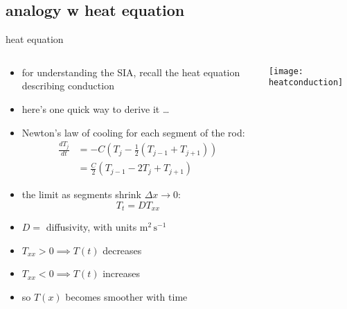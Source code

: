 \subsection{analogy w heat equation}

\begin{frame}{heat equation}

\small
\begin{columns}
\begin{column}{0.6\textwidth}
\begin{itemize}
\item for understanding the SIA, recall the heat equation describing conduction
\item here's one quick way to derive it \dots
\item Newton's law of cooling for each segment of the rod:
\begin{align*}
\frac{dT_j}{dt} &= - C \left(T_j - \frac{1}{2} (T_{j-1} + T_{j+1}) \right) \\
	&= \frac{C}{2} \left(T_{j-1} - 2 T_j + T_{j+1}\right) 
\end{align*}
\item the limit as segments shrink $\Delta x\to 0$:
	$$T_t = D T_{xx}$$
\item $D=$ diffusivity, with units $\text{m}^2\,\text{s}^{-1}$
\item $T_{xx}>0 \implies T(t)$ decreases
\item $T_{xx}<0 \implies T(t)$ increases
\item so $T(x)$ becomes smoother with time
\end{itemize}
\end{column}

\begin{column}{0.4\textwidth}
\hfill
\vspace{0.3in}
\texttt{[image: heatconduction]}
\end{column}
\end{columns}
\end{frame}


